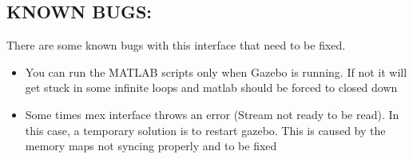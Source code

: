 \documentclass[letterpaper,10pt]{article}
\begin{document}
\subsection{KNOWN BUGS:}\label{known-bugs}

There are some known bugs with this interface that need to be fixed. 
\begin{itemize}
 \item You can run the MATLAB scripts only when Gazebo is running. If not it
will get stuck in some infinite loops and matlab should be forced to
closed down 
\item Some times mex interface throws an error (Stream not ready
to be read). In this case, a temporary solution is to restart gazebo.
This is caused by the memory maps not syncing properly and to be fixed
\end{itemize}
\end{document}

